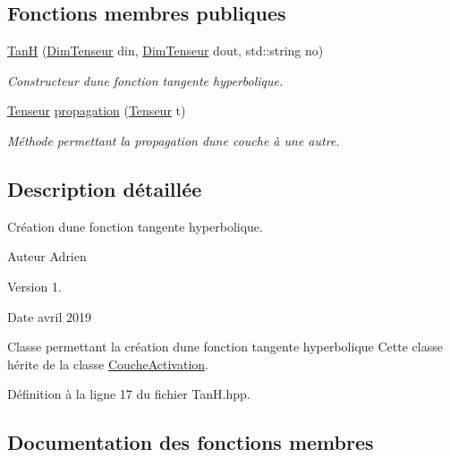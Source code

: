 \subsection*{Fonctions membres publiques}
\begin{DoxyCompactItemize}
\item 
\mbox{\label{class_tan_h_a15a43acf406e3ed45c632bcd451f97f6}} 
\hyperlink{class_tan_h_a15a43acf406e3ed45c632bcd451f97f6}{TanH} (\hyperlink{class_dim_tenseur}{Dim\+Tenseur} din, \hyperlink{class_dim_tenseur}{Dim\+Tenseur} dout, std\+::string no)
\begin{DoxyCompactList}\small\item\em Constructeur d\textquotesingle{}une fonction tangente hyperbolique. \end{DoxyCompactList}\item 
\hyperlink{class_tenseur}{Tenseur} \hyperlink{class_tan_h_a869967c9b278c6592e6fcc04b61a5f0c}{propagation} (\hyperlink{class_tenseur}{Tenseur} t)
\begin{DoxyCompactList}\small\item\em Méthode permettant la propagation d\textquotesingle{}une couche à une autre. \end{DoxyCompactList}\end{DoxyCompactItemize}


\subsection{Description détaillée}
Création d\textquotesingle{}une fonction tangente hyperbolique. 

\begin{DoxyAuthor}{Auteur}
Adrien 
\end{DoxyAuthor}
\begin{DoxyVersion}{Version}
1. 
\end{DoxyVersion}
\begin{DoxyDate}{Date}
avril 2019
\end{DoxyDate}
Classe permettant la création d\textquotesingle{}une fonction tangente hyperbolique Cette classe hérite de la classe \hyperlink{class_couche_activation}{Couche\+Activation}. 

Définition à la ligne 17 du fichier Tan\+H.\+hpp.



\subsection{Documentation des fonctions membres}
\mbox{\label{class_tan_h_a869967c9b278c6592e6fcc04b61a5f0c}} 

